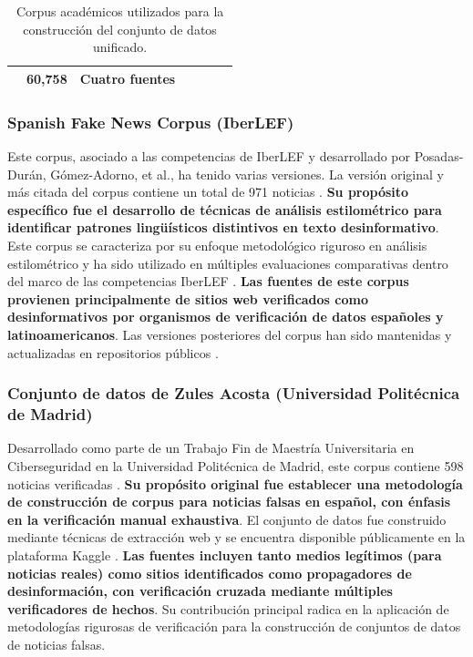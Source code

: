 \begin{table}[htbp]
{\begin{tabular}{|c|l|l|c|c|l|c|}
\hline
\rowcolor{HeaderBlue!20}
\multicolumn{5}{|c|}{\textbf{TOTAL CORPUS ACADÉMICOS}} & \textbf{60,758} & \textbf{Cuatro fuentes} \\
\hline
\end{tabular}
}
\caption{Corpus académicos utilizados para la construcción del conjunto de datos unificado.}
\label{tab:corpus_academicos}
\end{table}

\subsubsection{Spanish Fake News Corpus (IberLEF)}

Este corpus, asociado a las competencias de IberLEF y desarrollado por Posadas-Durán, Gómez-Adorno, et al., ha tenido varias versiones. La versión original y más citada del corpus contiene un total de 971 noticias \cite{posadas2019detection}. \textbf{Su propósito específico fue el desarrollo de técnicas de análisis estilométrico para identificar patrones lingüísticos distintivos en texto desinformativo}. Este corpus se caracteriza por su enfoque metodológico riguroso en análisis estilométrico y ha sido utilizado en múltiples evaluaciones comparativas dentro del marco de las competencias IberLEF \cite{gomez2021overview, aragon2020overview}. \textbf{Las fuentes de este corpus provienen principalmente de sitios web verificados como desinformativos por organismos de verificación de datos españoles y latinoamericanos}. Las versiones posteriores del corpus han sido mantenidas y actualizadas en repositorios públicos \cite{ramirez2021spanish}.

\subsubsection{Conjunto de datos de Zules Acosta (Universidad Politécnica de Madrid)}

Desarrollado como parte de un Trabajo Fin de Maestría Universitaria en Ciberseguridad en la Universidad Politécnica de Madrid, este corpus contiene 598 noticias verificadas \cite{acosta2019construccion}. \textbf{Su propósito original fue establecer una metodología de construcción de corpus para noticias falsas en español, con énfasis en la verificación manual exhaustiva}. El conjunto de datos fue construido mediante técnicas de extracción web y se encuentra disponible públicamente en la plataforma Kaggle \cite{acosta2019dataset, zules2019spanish}. \textbf{Las fuentes incluyen tanto medios legítimos (para noticias reales) como sitios identificados como propagadores de desinformación, con verificación cruzada mediante múltiples verificadores de hechos}. Su contribución principal radica en la aplicación de metodologías rigurosas de verificación para la construcción de conjuntos de datos de noticias falsas.

